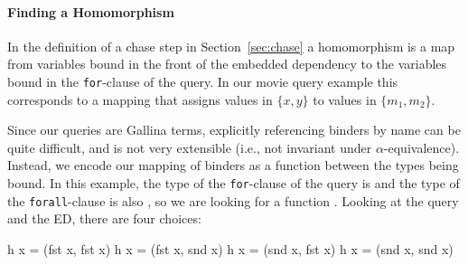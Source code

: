 \documentclass[preprint]{sigplanconf}
\begin{document}
\paragraph{Finding a Homomorphism}
In the definition of a chase step in Section~\ref{sec:chase} a homomorphism is a map from variables bound in the front of the embedded dependency to the variables bound in the {\tt for}-clause of the query.
In our movie query example this corresponds to a mapping that assigns values in $\{x,y\}$ to values in $\{m_1,m_2\}$.

Since our queries are Gallina terms, explicitly referencing binders by name can be quite difficult, and is not very extensible (i.e., not invariant under $\alpha$-equivalence).
Instead, we encode our mapping of binders as a function between the types being bound.
In this example, the type of the {\tt for}-clause of the query is  and the type of the {\tt forall}-clause is also , so we are looking for a function .
Looking at the query and the ED, there are four choices:
\begin{coq}
h x = (fst x, fst x)
h x = (fst x, snd x)
h x = (snd x, fst x)
h x = (snd x, snd x)
\end{coq}
\end{document}
